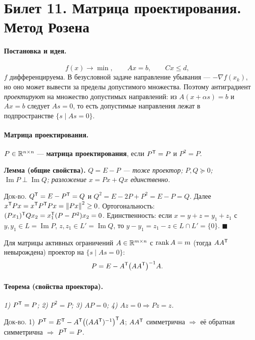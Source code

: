 \section{Билет 11. Матрица проектирования. Метод Розена}


\paragraph{Постановка и идея.}
\[
  f(x) \to \min , \qquad Ax = b , \qquad Cx \le d ,
\]
$f$ дифференцируема. В безусловной задаче направление убывания —
$-\nabla f(x_k)$, но оно может вывести за пределы допустимого множества.
Поэтому антиградиент \emph{проектируют} на множество допустимых направлений:
из $A(x + \alpha s) = b$ и $Ax = b$ следует $As = 0$, то есть допустимые
направления лежат в подпространстве $\{s \mid As = 0\}$.

\paragraph{Матрица проектирования.}
$P \in \mathbb{R}^{n\times n}$ — \textbf{матрица проектирования}, если
$P^{\mathsf{T}} = P$ и $P^2 = P$.

\textbf{Лемма (общие свойства).} \textit{$Q = E - P$ — тоже проектор;
$P, Q \succeq 0$; $\operatorname{Im}P \perp \operatorname{Im}Q$; разложение
$x = Px + Qx$ единственно.}

\textsc{Док-во.} $Q^{\mathsf{T}} = E - P^{\mathsf{T}} = Q$ и
$Q^2 = E - 2P + P^2 = E - P = Q$. Далее
$x^{\mathsf{T}} Px = x^{\mathsf{T}} P^{\mathsf{T}} Px = \left\lVert Px \right\rVert^2 \ge 0$. Ортогональность:
$(Px_1)^{\mathsf{T}} Qx_2 = x_1^{\mathsf{T}}(P - P^2)x_2 = 0$. Единственность: если
$x = y+z = y_1+z_1$ с $y,y_1 \in L = \operatorname{Im}P$,
$z,z_1 \in L' = \operatorname{Im}Q$, то
$y - y_1 = z_1 - z \in L \cap L' = \{0\}$. $\blacksquare$

Для матрицы активных ограничений $A \in \mathbb{R}^{m\times n}$ с $\operatorname{rank} A = m$
(тогда $AA^{\mathsf{T}}$ невырождена) проектор на $\{s \mid As = 0\}$:
\[
  P = E - A^{\mathsf{T}}\big(AA^{\mathsf{T}}\big)^{-1}A .
\]

\paragraph{Теорема (свойства проектора).}
\textit{1) $P^{\mathsf{T}} = P$; 2) $P^2 = P$; 3) $AP = 0$; 4) $Az = 0 \Rightarrow Pz = z$.}

\textsc{Док-во.}
1) $P^{\mathsf{T}} = E^{\mathsf{T}} - A^{\mathsf{T}}\big((AA^{\mathsf{T}})^{-1}\big)^{\mathsf{T}} A$; $AA^{\mathsf{T}}$ симметрична
$\Rightarrow$ её обратная симметрична $\Rightarrow$ $P^{\mathsf{T}} = P$.

